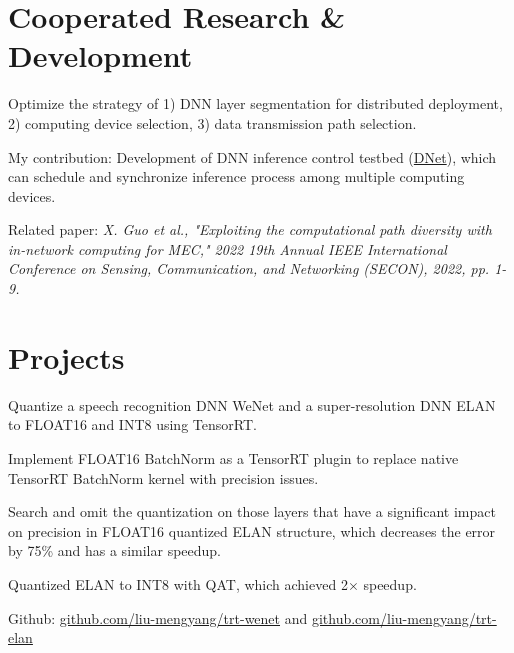 \documentclass[]{deedy-resume-openfont}
\begin{document}
\begin{minipage}[t]{0.77\textwidth}
\section{Cooperated Research \& Development}
\begin{tightemize}
    \item Optimize the strategy of 1) DNN layer segmentation for distributed deployment, 2) computing device selection, 3) data transmission path selection.
    \item My contribution: Development of DNN inference control testbed (\href{https://github.com/yindaheng98/DNet}{DNet}), which can schedule and synchronize inference process among multiple computing devices.
    \item Related paper: \textit{X. Guo et al., "Exploiting the computational path diversity with in-network computing for MEC," 2022 19th Annual IEEE International Conference on Sensing, Communication, and Networking (SECON), 2022, pp. 1-9.}
\end{tightemize}
\sectionsep

\section{Projects}
\begin{tightemize}
    \item Quantize a speech recognition DNN WeNet and a super-resolution DNN ELAN to FLOAT16 and INT8 using TensorRT.
    \item Implement FLOAT16 BatchNorm as a TensorRT plugin to replace native TensorRT BatchNorm kernel with precision issues.
    \item Search and omit the quantization on those layers that have a significant impact on precision in FLOAT16 quantized ELAN structure, which decreases the error by 75\% and has a similar speedup.
    \item Quantized ELAN to INT8 with QAT, which achieved 2$\times$ speedup.
    \item Github: \href{https://github.com/liu-mengyang/trt-wenet}{github.com/liu-mengyang/trt-wenet} and \href{https://github.com/liu-mengyang/trt-elan}{github.com/liu-mengyang/trt-elan}
\end{tightemize}
\sectionsep


\end{minipage}
\end{document}
